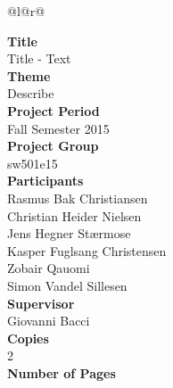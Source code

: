 
\begin{nopagebreak}
{\begin{center}
    \begin{tabular*}{\textwidth}{@{}l@{\extracolsep{\fill}}r@{}}
        \\
        \begin{minipage}[t]{0.49\textwidth}
            \textbf{Title}\\
            Title - Text\\

            \textbf{Theme}\\
            Describe\\

            \textbf{Project Period}\\
            Fall Semester 2015\\

            \textbf{Project Group}\\
            sw501e15\\

            \textbf{Participants}\\
            Rasmus Bak Christiansen\\
            Christian Heider Nielsen\\
            Jens Hegner Stærmose\\
            Kasper Fuglsang Christensen\\
            Zobair Qauomi\\
            Simon Vandel Sillesen\\

            \textbf{Supervisor}\\
            Giovanni Bacci\\

            \textbf{Copies}\\
            2\\ %

            \textbf{Number of Pages}\\
            \pageref{LastPage}\\


\end{minipage}
\end{tabular*}
\end{center}}
\end{nopagebreak}

